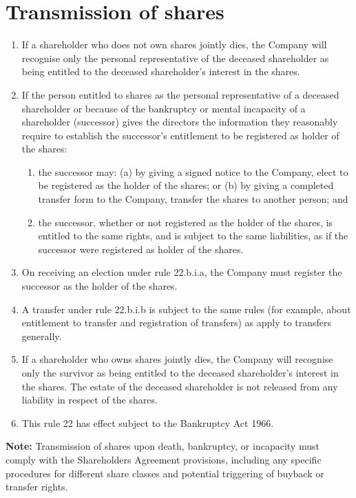 \section{Transmission of shares}

\begin{enumerate}[label=(\alph*)]
    \item If a shareholder who does not own shares jointly dies, the Company will recognise only the personal representative of the deceased shareholder as being entitled to the deceased shareholder's interest in the shares.
    
    \item If the person entitled to shares as the personal representative of a deceased shareholder or because of the bankruptcy or mental incapacity of a shareholder (successor) gives the directors the information they reasonably require to establish the successor's entitlement to be registered as holder of the shares:
    \begin{enumerate}[label=(\roman*)]
        \item the successor may: (a) by giving a signed notice to the Company, elect to be registered as the holder of the shares; or (b) by giving a completed transfer form to the Company, transfer the shares to another person; and
        \item the successor, whether or not registered as the holder of the shares, is entitled to the same rights, and is subject to the same liabilities, as if the successor were registered as holder of the shares.
    \end{enumerate}
    
    \item On receiving an election under rule 22.b.i.a, the Company must register the successor as the holder of the shares.
    
    \item A transfer under rule 22.b.i.b is subject to the same rules (for example, about entitlement to transfer and registration of transfers) as apply to transfers generally.
    
    \item If a shareholder who owns shares jointly dies, the Company will recognise only the survivor as being entitled to the deceased shareholder's interest in the shares. The estate of the deceased shareholder is not released from any liability in respect of the shares.
    
    \item This rule 22 has effect subject to the Bankruptcy Act 1966.
\end{enumerate}

\textbf{Note:} Transmission of shares upon death, bankruptcy, or incapacity must comply with the Shareholders Agreement provisions, including any specific procedures for different share classes and potential triggering of buyback or transfer rights. 